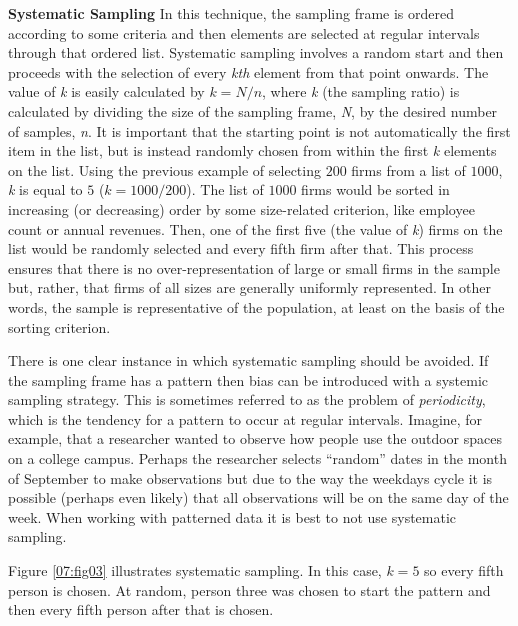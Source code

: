 \textbf{Systematic Sampling} In this technique, the sampling frame is ordered according to some criteria and then elements are selected at regular intervals through that ordered list. Systematic sampling involves a random start and then proceeds with the selection of every \textit{kth} element from that point onwards. The value of \textit{k} is easily calculated by $ k = N/n $, where \textit{k} (the sampling ratio) is calculated by dividing the size of the sampling frame, \textit{N}, by the desired number of samples, \textit{n}. It is important that the starting point is not automatically the first item in the list, but is instead randomly chosen from within the first \textit{k} elements on the list. Using the previous example of selecting $ 200 $ firms from a list of $ 1000 $, \textit{k} is equal to $ 5 $ ($ k = 1000/200 $). The list of $ 1000 $ firms would be sorted in increasing (or decreasing) order by some size-related criterion, like employee count or annual revenues. Then, one of the first five (the value of \textit{k}) firms on the list would be randomly selected and every fifth firm after that. This process ensures that there is no over-representation of large or small firms in the sample but, rather, that firms of all sizes are generally uniformly represented. In other words, the sample is representative of the population, at least on the basis of the sorting criterion.
	
There is one clear instance in which systematic sampling should be avoided. If the sampling frame has a pattern then bias can be introduced with a systemic sampling strategy. This is sometimes referred to as the problem of \textit{periodicity}, which is the tendency for a pattern to occur at regular intervals. Imagine, for example, that a researcher wanted to observe how people use the outdoor spaces on a college campus. Perhaps the researcher selects ``random'' dates in the month of September to make observations but due to the way the weekdays cycle it is possible (perhaps even likely) that all observations will be on the same day of the week. When working with patterned data it is best to not use systematic sampling.

Figure \ref{07:fig03} illustrates systematic sampling. In this case, $ k = 5 $ so every fifth person is chosen. At random, person three was chosen to start the pattern and then every fifth person after that is chosen.

